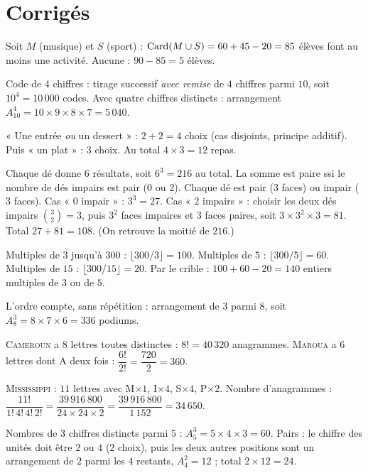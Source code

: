 \section{Corrigés}

Soit $M$ (musique) et $S$ (sport) : $\operatorname{Card}(M\cup S)=60+45-20=85$ élèves font au moins
une activité. Aucune : $90-85=5$ élèves.

Code de $4$ chiffres : tirage successif \emph{avec remise} de $4$ chiffres parmi $10$, soit $10^{4}=10\,000$ codes. Avec quatre chiffres distincts : arrangement $A_{10}^{4}=10\times 9\times 8\times 7=5\,040$.

« Une entrée \emph{ou} un dessert » : $2+2=4$ choix (cas disjoints, principe additif). Puis « un plat » : $3$ choix. Au total $4\times 3=12$ repas.

Chaque dé donne $6$ résultats, soit $6^{3}=216$ au total. La somme est paire ssi le nombre de dés impairs est pair ($0$ ou $2$). Chaque dé est pair ($3$ faces) ou impair ($3$ faces). Cas « $0$ impair » : $3^{3}=27$. Cas « $2$ impairs » : choisir les deux dés impairs $\binom32=3$, puis $3^{2}$ faces impaires et $3$ faces paires, soit $3\times 3^{2}\times 3=81$. Total $27+81=108$. (On retrouve la moitié de $216$.)

Multiples de $3$ jusqu'à $300$ : $\lfloor 300/3\rfloor=100$. Multiples de $5$ : $\lfloor300/5\rfloor=60$.
Multiples de $15$ : $\lfloor300/15\rfloor=20$. Par le crible :
$100+60-20=140$ entiers multiples de $3$ ou de $5$.

L'ordre compte, sans répétition : arrangement de $3$ parmi $8$, soit $A_{8}^{3}=8\times 7\times 6=336$ podiums.

\textsc{Cameroun} a $8$ lettres toutes distinctes : $8!=40\,320$ anagrammes. \textsc{Maroua} a $6$ lettres dont A deux fois : $\dfrac{6!}{2!}=\dfrac{720}{2}=360$.

\textsc{Mississippi} : $11$ lettres avec M$\times1$, I$\times4$, S$\times4$, P$\times2$.
Nombre d'anagrammes : $\dfrac{11!}{1!\,4!\,4!\,2!}=\dfrac{39\,916\,800}{24\times24\times2}
=\dfrac{39\,916\,800}{1\,152}=34\,650$.

Nombres de $3$ chiffres distincts parmi $5$ : $A_5^{3}=5\times 4\times 3=60$. Pairs : le chiffre des unités doit être $2$ ou $4$ ($2$ choix), puis les deux autres positions sont un arrangement de $2$ parmi les $4$ restants, $A_4^{2}=12$ ; total $2\times 12=24$.

